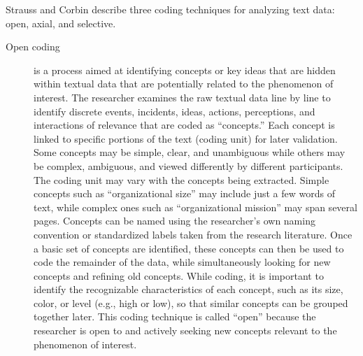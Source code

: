 Strauss and Corbin\cite{strauss1998basics} describe three coding techniques for analyzing text data: open, axial, and selective. 

\begin{description}

\item[Open coding] is a process aimed at identifying concepts or key ideas that are hidden within textual data that are potentially related to the phenomenon of interest. The researcher examines the raw textual data line by line to identify discrete events, incidents, ideas, actions, perceptions, and interactions of relevance that are coded as ``concepts.'' Each concept is linked to specific portions of the text (coding unit) for later validation. Some concepts may be simple, clear, and unambiguous while others may be complex, ambiguous, and viewed differently by different participants. The coding unit may vary with the concepts being extracted. Simple concepts such as ``organizational size'' may include just a few words of text, while complex ones such as ``organizational mission'' may span several pages. Concepts can be named using the researcher's own naming convention or standardized labels taken from the research literature. Once a basic set of concepts are identified, these concepts can then be used to code the remainder of the data, while simultaneously looking for new concepts and refining old concepts. While coding, it is important to identify the recognizable characteristics of each concept, such as its size, color, or level (e.g., high or low), so that similar concepts can be grouped together later. This coding technique is called ``open'' because the researcher is open to and actively seeking new concepts relevant to the phenomenon of interest.


\end{description}
